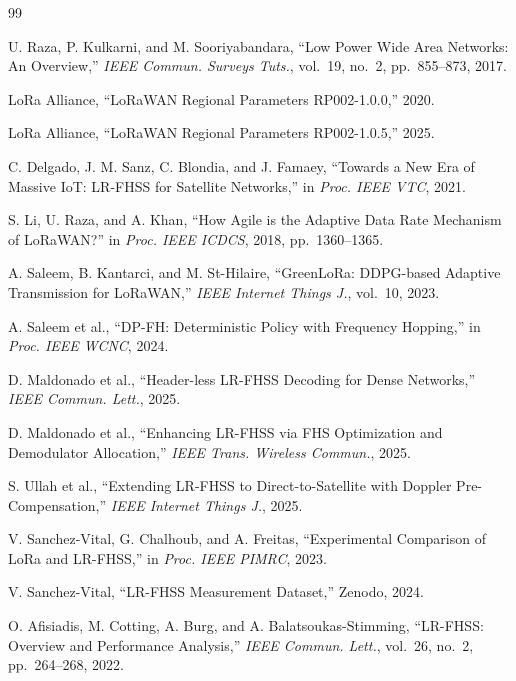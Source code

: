 \documentclass[conference]{IEEEtran}
\begin{document}
	\begin{thebibliography}{99}
		
		U. Raza, P. Kulkarni, and M. Sooriyabandara,
		``Low Power Wide Area Networks: An Overview,''
		\textit{IEEE Commun. Surveys Tuts.}, vol.~19, no.~2, pp.~855--873, 2017.
		
		LoRa Alliance, ``LoRaWAN Regional Parameters RP002-1.0.0,'' 2020.
		
		LoRa Alliance, ``LoRaWAN Regional Parameters RP002-1.0.5,'' 2025.
		
		C. Delgado, J. M. Sanz, C. Blondia, and J. Famaey,
		``Towards a New Era of Massive IoT: LR-FHSS for Satellite Networks,''
		in \textit{Proc. IEEE VTC}, 2021.
		
		S. Li, U. Raza, and A. Khan,
		``How Agile is the Adaptive Data Rate Mechanism of LoRaWAN?''
		in \textit{Proc. IEEE ICDCS}, 2018, pp.~1360--1365.
		
		A. Saleem, B. Kantarci, and M. St-Hilaire,
		``GreenLoRa: DDPG-based Adaptive Transmission for LoRaWAN,''
		\textit{IEEE Internet Things J.}, vol.~10, 2023.
		
		A. Saleem et al., ``DP-FH: Deterministic Policy with Frequency Hopping,''
		in \textit{Proc. IEEE WCNC}, 2024.
		
		D. Maldonado et al.,
		``Header-less LR-FHSS Decoding for Dense Networks,''
		\textit{IEEE Commun. Lett.}, 2025.
		
		D. Maldonado et al.,
		``Enhancing LR-FHSS via FHS Optimization and Demodulator Allocation,''
		\textit{IEEE Trans. Wireless Commun.}, 2025.
		
		S. Ullah et al.,
		``Extending LR-FHSS to Direct-to-Satellite with Doppler Pre-Compensation,''
		\textit{IEEE Internet Things J.}, 2025.
		
		V. Sanchez-Vital, G. Chalhoub, and A. Freitas,
		``Experimental Comparison of LoRa and LR-FHSS,''
		in \textit{Proc. IEEE PIMRC}, 2023.
		
		V. Sanchez-Vital, ``LR-FHSS Measurement Dataset,'' Zenodo, 2024.
		
		O. Afisiadis, M. Cotting, A. Burg, and A. Balatsoukas-Stimming,
		``LR-FHSS: Overview and Performance Analysis,''
		\textit{IEEE Commun. Lett.}, vol.~26, no.~2, pp.~264--268, 2022.
		

\end{thebibliography}
\end{document}
